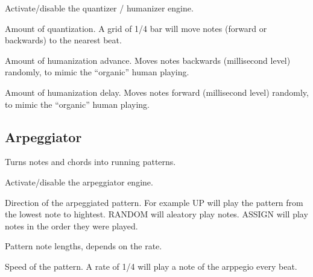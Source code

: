 
  

Activate/disable the quantizer / humanizer engine.

       

Amount of quantization. A grid of 1/4 bar will move notes (forward or backwards) to the nearest beat.

  \settingopt{\ldots} 

Amount of humanization advance. Moves notes backwards (millisecond level) randomly, to mimic the ``organic'' human playing.

  \settingopt{\ldots} 

Amount of humanization delay. Moves notes forward (millisecond level) randomly, to mimic the ``organic'' human playing.

\subsection{Arpeggiator}

Turns notes and chords into running patterns.


  

Activate/disable the arpeggiator engine.

     

Direction of the arpeggiated pattern. For example UP will play the pattern from the lowest note to hightest. RANDOM will aleatory play notes. ASSIGN will play notes in the order they were played.

  \settingopt{\ldots} 

Pattern note lengths, depends on the rate.

  \settingopt{\ldots} 

Speed of the pattern. A rate of 1/4 will play a note of the arppegio every beat.

  \settingopt{\ldots} 

